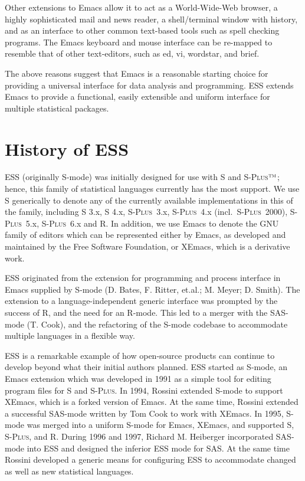 \documentclass{article}
\newcommand*{\Splus}{\textsc{S-Plus}}
\newcommand{\tm}{$^{\mbox{\scriptsize\sc tm}}$}
\begin{document}
Other extensions to Emacs allow it to act as a World-Wide-Web browser,
a highly sophisticated mail and news reader, a shell/terminal window
with history, and as an interface to other common text-based tools
such as spell checking programs.  The Emacs keyboard and mouse
interface can be re-mapped to resemble that of other text-editors,
such as ed, vi, wordstar, and brief.

The above reasons suggest that Emacs is a reasonable starting choice
for providing a universal interface for data analysis and programming.
ESS extends Emacs to provide a functional, easily extensible and
uniform interface for multiple statistical packages.

\section{History of ESS}
\label{sec:ESS:history}

ESS (originally S-mode) was initially designed for use with S and
\Splus\tm; hence, this family of statistical languages currently has
the most support.  We use S generically to denote any of the currently
available implementations in this of the family, including S 3.x, S
4.x, \Splus~3.x, \Splus~4.x (incl.\ \Splus~2000), \Splus~5.x,
\Splus~6.x and R.  In addition, we use Emacs to denote the GNU family
of editors which can be represented either by Emacs, as developed and
maintained by the Free Software Foundation, or XEmacs, which is a
derivative work.

ESS originated from the extension for programming and process
interface in Emacs supplied by S-mode (D. Bates, F. Ritter, et.al.; 
M. Meyer; D. Smith).  The extension to a language-independent generic
interface was prompted by the success of R, and the need for an
R-mode.  This led to a merger with the SAS-mode (T. Cook), and the
refactoring of the S-mode codebase to accommodate multiple languages
in a flexible way.

ESS is a remarkable example of how open-source products can continue
to develop beyond what their initial authors planned.  ESS started as
S-mode, an Emacs extension which was developed in 1991 as a simple
tool for editing program files for S and \Splus.  In 1994, Rossini
extended S-mode to support XEmacs, which is a forked version of Emacs.
At the same time, Rossini extended a successful SAS-mode written by
Tom Cook to work with XEmacs.  In 1995, S-mode was merged into a
uniform S-mode for Emacs, XEmacs, and supported S, \Splus, and R.
During 1996 and 1997, Richard M. Heiberger incorporated SAS-mode into
ESS and designed the inferior ESS mode for SAS.  At the same time
Rossini developed a generic means for configuring ESS to accommodate
changed as well as new statistical languages.
\end{document}
